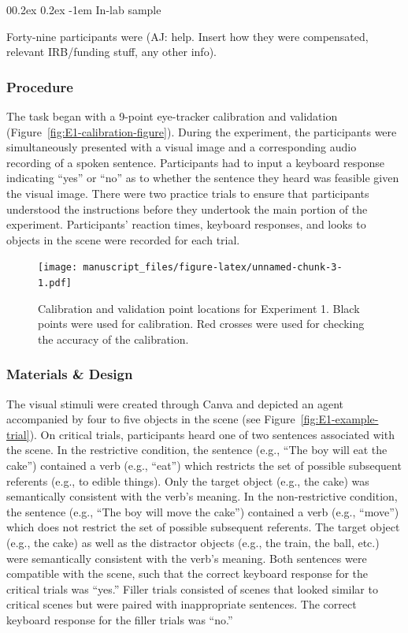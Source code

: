 \documentclass[
  man,floatsintext]{apa6}
\makeatletter
\let\oldparagraph\paragraph
\renewcommand{\paragraph}[1]{\oldparagraph{#1}\mbox{}}
\renewcommand{\paragraph}{\@startsection{paragraph}{4}{\parindent}%
  {0\baselineskip \@plus 0.2ex \@minus 0.2ex}%
  {-1em}%
  {\normalfont\normalsize\bfseries\itshape\typesectitle}}
\makeatother
\begin{document}
\hypertarget{in-lab-sample}{%
\paragraph{In-lab sample}\label{in-lab-sample}}

Forty-nine participants were (AJ: help. Insert how they were compensated, relevant IRB/funding stuff, any other info).

\hypertarget{procedure}{%
\subsubsection{Procedure}\label{procedure}}

The task began with a 9-point eye-tracker calibration
and validation (Figure~\ref{fig:E1-calibration-figure}).
During the experiment, the participants were
simultaneously presented with a visual image and a corresponding audio
recording of a spoken sentence. Participants had to input a keyboard
response indicating ``yes'' or ``no'' as to whether the sentence they heard
was feasible given the visual image. There were two practice trials to
ensure that participants understood the instructions
before they undertook the main portion of the experiment. Participants'
reaction times, keyboard responses, and looks to objects in the scene
were recorded for each trial.

\begin{figure}
\centering
\texttt{[image: manuscript\_files/figure-latex/unnamed-chunk-3-1.pdf]}
\caption{\label{fig:unnamed-chunk-3}Calibration and validation point locations for Experiment 1. Black points were used for calibration. Red crosses were used for checking the accuracy of the calibration.}
\end{figure}

\hypertarget{materials-design}{%
\subsubsection{Materials \& Design}\label{materials-design}}

The visual stimuli were created through Canva and depicted an agent
accompanied by four to five objects in the scene (see Figure~\ref{fig:E1-example-trial}). On
critical trials, participants heard one of two sentences associated with
the scene. In the restrictive condition, the sentence (e.g., ``The boy
will eat the cake'') contained a verb (e.g., ``eat'') which restricts the
set of possible subsequent referents (e.g., to edible things). Only the
target object (e.g., the cake) was semantically consistent with the
verb's meaning. In the non-restrictive condition, the sentence (e.g.,
``The boy will move the cake'') contained a verb (e.g., ``move'') which does
not restrict the set of possible subsequent referents. The target object
(e.g., the cake) as well as the distractor objects (e.g., the train, the
ball, etc.) were semantically consistent with the verb's meaning. Both
sentences were compatible with the scene, such that the correct keyboard
response for the critical trials was ``yes.'' Filler trials consisted of
scenes that looked similar to critical scenes but were paired with
inappropriate sentences. The correct keyboard response for the filler
trials was ``no.''
\end{document}

